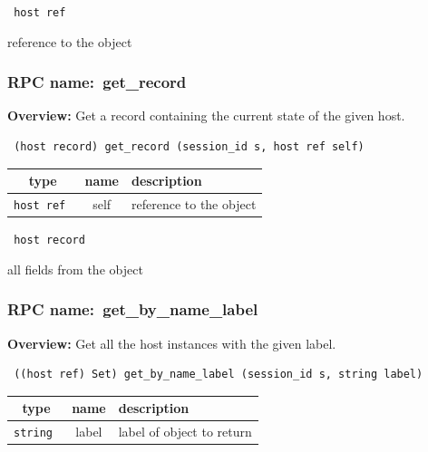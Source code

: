\vspace{0.3cm}

{\tt 
host ref
}


reference to the object
\vspace{0.3cm}
\vspace{0.3cm}
\vspace{0.3cm}
\subsubsection{RPC name:~get\_record}

{\bf Overview:} 
Get a record containing the current state of the given host.

\begin{verbatim} (host record) get_record (session_id s, host ref self)\end{verbatim}



 
\vspace{0.3cm}
\begin{tabular}{|c|c|p{7cm}|}
 \hline
{\bf type} & {\bf name} & {\bf description} \\ \hline
{\tt host ref } & self & reference to the object \\ \hline 

\end{tabular}

\vspace{0.3cm}

{\tt 
host record
}


all fields from the object
\vspace{0.3cm}
\vspace{0.3cm}
\vspace{0.3cm}
\subsubsection{RPC name:~get\_by\_name\_label}

{\bf Overview:} 
Get all the host instances with the given label.

\begin{verbatim} ((host ref) Set) get_by_name_label (session_id s, string label)\end{verbatim}



 
\vspace{0.3cm}
\begin{tabular}{|c|c|p{7cm}|}
 \hline
{\bf type} & {\bf name} & {\bf description} \\ \hline
{\tt string } & label & label of object to return \\ \hline 

\end{tabular}

